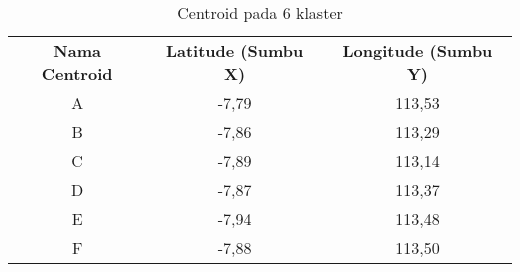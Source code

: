 \begin{table}[H]
\footnotesize
\centering
\begin{tabular}{ccc}
\rowcolor[HTML]{4472C4} 
{\color[HTML]{FFFFFF} \textbf{Nama   Centroid}} & {\color[HTML]{FFFFFF} \textbf{Latitude (Sumbu X)}} & {\color[HTML]{FFFFFF} \textbf{Longitude (Sumbu Y)}} \\
\rowcolor[HTML]{D9E1F2} 
A & -7,79 & 113,53 \\
B & -7,86 & 113,29 \\
\rowcolor[HTML]{D9E1F2} 
C & -7,89 & 113,14 \\
D & -7,87 & 113,37 \\
\rowcolor[HTML]{D9E1F2} 
E & -7,94 & 113,48 \\
F & -7,88 & 113,50
\end{tabular}
\caption{Centroid pada 6 klaster}
\label{tab:center6}
\end{table}